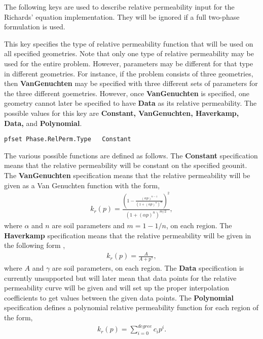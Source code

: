 The following keys are used to describe relative permeability input for the
Richards' equation implementation.  They will be ignored if a full two-phase
formulation is used.

{
This key specifies the type of relative permeability function that will be used
on all specified geometries.  Note that only one type of relative permeability
may be used for the entire problem.  However, parameters may be different for
that type in different geometries.  For instance, if the problem consists of
three geometries, then {\bf VanGenuchten} may be specified with three different
sets of parameters for the three different goemetries.  However, once {\bf
VanGenuchten} is specified, one geometry cannot later be specified to have {\bf
Data} as its relative permeability.  The possible values for this key 
are {\bf Constant, VanGenuchten, Haverkamp, Data,} and {\bf  Polynomial}.
}
\begin{display}\begin{verbatim}
pfset Phase.RelPerm.Type   Constant
\end{verbatim}\end{display}

The various possible functions are defined as follows.
The {\bf Constant} specification means that the relative permeability will be
constant on the specified geounit.  The {\bf VanGenuchten} specification means
that the relative permeability will be given as a Van Genuchten function
\cite{VanGenuchten80} with the form,
\begin{eqnarray}
k_r(p) = \frac{(1 - \frac{(\alpha p)^{n-1}}{(1 + (\alpha p)^n)^m})^2}
{(1 + (\alpha p)^n)^{m/2}},
\end{eqnarray}
where $\alpha$ and $n$ are soil parameters and $m = 1 - 1/n$, on each region.
The {\bf Haverkamp} specification means that the relative permeability will be
given in the following form \cite{Haverkamp-Vauclin81},
\begin{eqnarray}
k_r(p) = \frac{A}{A + p^{\gamma}},
\end{eqnarray}
where $A$ and $\gamma$ are soil parameters, on each region.
The {\bf Data} specification is currently unsupported but will later mean that
data points for the relative permeability curve will be given and \parflow{}
will set up the proper interpolation coefficients to get values between the
given data points.
The {\bf Polynomial} specification
defines a polynomial relative permeability function for each 
region of the form,
\begin{eqnarray}
k_r(p) = \sum_{i=0}^{degree} c_ip^i.
\end{eqnarray}

